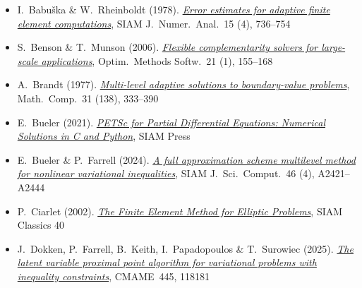 \let\plainhref\href
\renewcommand{\href}[2]{\plainhref{#1}{\textcolor{icBlue}{#2}}}

\setlength{\leftmargini}{1em}  %
\begin{itemize}\setlength{\itemsep}{2pt}
\small
\item I.~Babu\v{s}ka \& W.~Rheinboldt (1978). \href{https://doi.org/10.1137/0715049}{\emph{Error estimates for adaptive finite element computations}}, SIAM J.~Numer.~Anal.~15 (4), 736--754

\item S.~Benson \& T.~Munson (2006). \href{https://doi.org/10.1080/10556780500065382}{\emph{Flexible complementarity solvers for large-scale applications}}, Optim.~Methods Softw.~21 (1), 155--168

\item A.~Brandt (1977). \href{https://doi.org/10.1090/S0025-5718-1977-0431719-X}{\emph{Multi-level adaptive solutions to boundary-value problems}}, Math.~Comp.~31 (138), 333--390

\item E.~Bueler (2021). \href{https://doi.org/10.1137/1.9781611976311}{\emph{PETSc for Partial Differential Equations: Numerical Solutions in C and Python}}, SIAM Press


\item E.~Bueler \& P.~Farrell (2024). \href{https://doi.org/10.1137/23m1594200}{\emph{A full approximation scheme multilevel method for nonlinear variational inequalities}}, SIAM J.~Sci.~Comput.~46 (4), A2421--A2444

\item P.~Ciarlet (2002). \href{https://doi.org/10.1137/1.9780898719208}{\emph{The Finite Element Method for Elliptic Problems}}, SIAM Classics 40

\item J.~Dokken, P.~Farrell, B.~Keith, I.~Papadopoulos \& T.~Surowiec (2025). \href{https://doi.org/10.1016/j.cma.2025.118181}{\emph{The latent variable proximal point algorithm for variational problems with inequality constraints}}, CMAME~445, 118181



\end{itemize}
